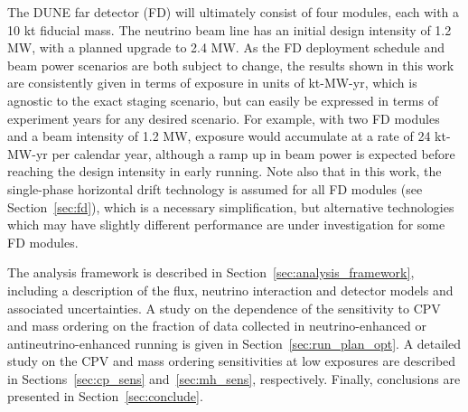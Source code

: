 The DUNE far detector (FD) will ultimately consist of four modules, each with a 10 kt fiducial mass. The neutrino beam line has an initial design intensity of 1.2 MW, with a planned upgrade to 2.4 MW. As the FD deployment schedule and beam power scenarios are both subject to change, the results shown in this work are consistently given in terms of exposure in units of kt-MW-yr, which is agnostic to the exact staging scenario, but can easily be expressed in terms of experiment years for any desired scenario. For example, with two FD modules and a beam intensity of 1.2 MW, exposure would accumulate at a rate of 24 kt-MW-yr per calendar year, although a ramp up in beam power is expected before reaching the design intensity in early running. Note also that in this work, the single-phase horizontal drift technology is assumed for all FD modules (see Section~\ref{sec:fd}), which is a necessary simplification, but alternative technologies which may have slightly different performance are under investigation for some FD modules.

The analysis framework is described in Section~\ref{sec:analysis_framework}, including a description of the flux, neutrino interaction and detector models and associated uncertainties. A study on the dependence of the sensitivity to CPV and mass ordering on the fraction of data collected in neutrino-enhanced or antineutrino-enhanced running is given in Section~\ref{sec:run_plan_opt}. A detailed study on the CPV and mass ordering sensitivities at low exposures are described in Sections~\ref{sec:cp_sens} and~\ref{sec:mh_sens}, respectively. Finally, conclusions are presented in Section~\ref{sec:conclude}.

